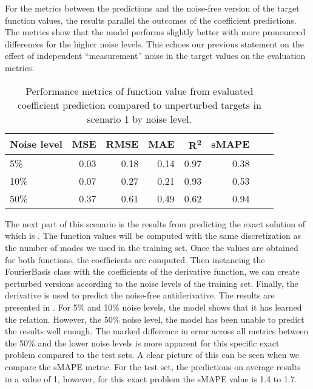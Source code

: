 For the metrics between the predictions and the noise-free version of the target function values, the results parallel the outcomes of the coefficient predictions. The metrics show that the model performs slightly better with more pronounced differences for the higher noise levels. This echoes our previous statement on the effect of independent \enquote{measurement} noise in the target values on the evaluation metrics.
\begin{table}[H]
  \caption{Performance metrics of function value from evaluated coefficient prediction compared to unperturbed targets in scenario 1 by noise level.}\label{table:scenario_1_clean_function_metrics}
  \centering
  \begin{tabular}{lrrrrrrr}
    \toprule
    Noise level & MSE  & RMSE & MAE  & R\textsuperscript{2} & sMAPE \\
    \midrule
    5\%         & 0.03 & 0.18 & 0.14 & 0.97                 & 0.38  \\
    10\%        & 0.07 & 0.27 & 0.21 & 0.93                 & 0.53  \\
    50\%        & 0.37 & 0.61 & 0.49 & 0.62                 & 0.94  \\
    \bottomrule
  \end{tabular}
\end{table}

The next part of this scenario is the results from predicting the exact solution of  which is . The function values will be computed with the same discretization as the number of modes we used in the training set. Once the values are obtained for both functions, the coefficients are computed. Then instancing the FourierBasis class with the coefficients of the derivative function, we can create perturbed versions according to the noise levels of the training set. Finally, the derivative is used to predict the noise-free antiderivative. The results are presented in . For 5\% and 10\% noise levels, the model shows that it has learned the relation. However, the 50\% noise level, the model has been unable to predict the results well enough. The marked difference in error across all metrics between the 50\% and the lower noise levels is more apparent for this specific exact problem compared to the test sets. A clear picture of this can be seen when we compare the sMAPE metric. For the test set, the predictions on average results in a value of 1, however, for this exact problem the sMAPE value is 1.4 to 1.7.

